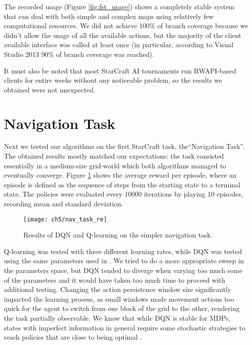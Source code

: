 The recorded usage (Figure \ref{fig:fst_usage}) shows a completely stable system
that can deal with both simple and complex maps using relatively few
computational resources. We did not achieve 100\% of branch coverage because we
didn't allow the usage of all the available actions, but the majority of the
client available interface was called at least once (in particular, according to
Visual Studio 2013 90\% of branch coverage was reached).

It must also be noted that most StarCraft AI tournaments
\citep{ontanon2013survey} run BWAPI-based clients for entire weeks without any
noticeable problem, so the results we obtained were not unexpected.

\section{Navigation Task}

Next we tested our algorithms on the first StarCraft task, the``Navigation
Task''. The obtained results mostly matched our expectations: the task consisted
essentially in a medium-size grid-world which both algorithms managed to
eventually converge. Figure \ref{fig:nav_task_results} shows the average reward
per episode, where an episode is defined as the sequence of steps from the
starting state to a terminal state. The policies were evaluated every 10000
iterations by playing 10 episodes, recording mean and standard deviation.

\begin{figure}[h]
    \centering
    \texttt{[image: ch5/nav\_task\_re]}
    \caption{Results of DQN and Q-learning on the simpler navigation task.}
    \label{fig:nav_task_results}
\end{figure}

Q-learning was tested with three different learning rates, while DQN was tested
using the same parameters used in \cite{mnih2015human}. We tried to do a more
appropriate sweep in the parameters space, but DQN tended to diverge when
varying too much some of the parameters and it would have taken too much time to
proceed with additional testing. Changing the action persistence window size
significantly impacted the learning process, as small windows made movement
actions too quick for the agent to switch from one block of the grid to the
other, rendering the task partially observable. We know that while DQN is stable
for MDPs, states with imperfect information in general require some stochastic
strategies to reach policies that are close to being optimal
\citep{heinrich2016deep}.

